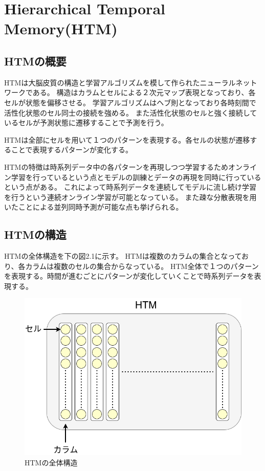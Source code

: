 \chapter{Hierarchical Temporal Memory(HTM)}
\section{HTMの概要}
HTMは大脳皮質の構造と学習アルゴリズムを模して作られたニューラルネットワークである。
構造はカラムとセルによる２次元マップ表現となっており、各セルが状態を偏移させる。
学習アルゴリズムはヘブ則となっており各時刻間で活性化状態のセル同士の接続を強める。
また活性化状態のセルと強く接続しているセルが予測状態に遷移することで予測を行う。

HTMは全部にセルを用いて１つのパターンを表現する。各セルの状態が遷移することで表現するパターンが変化する。

HTMの特徴は時系列データ中の各パターンを再現しつつ学習するためオンライン学習を行っているという点とモデルの訓練とデータの再現を同時に行っているという点がある。
これによって時系列データを連続してモデルに流し続け学習を行うという連続オンライン学習が可能となっている。
また疎な分散表現を用いたことによる並列同時予測が可能な点も挙げられる。

\section{HTMの構造}
HTMの全体構造を下の図2.1に示す。
HTMは複数のカラムの集合となっており、各カラムは複数のセルの集合からなっている。
HTM全体で１つのパターンを表現する。時間が進むごとにパターンが変化していくことで時系列データを表現する。

\begin{figure}[ht]
  \begin{center}
    \includegraphics[scale=0.5]{./fig/drawing_1}
    \caption{HTMの全体構造}
    \label{fig:HTM}
  \end{center}
\end{figure}

